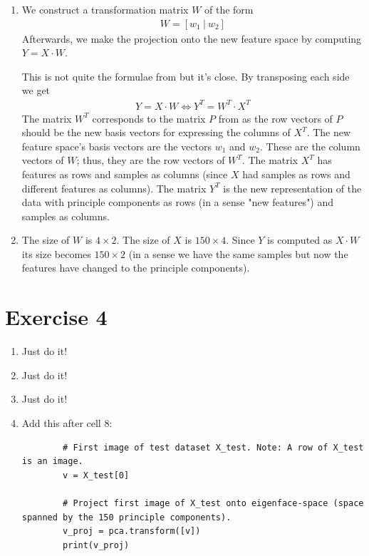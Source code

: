 \documentclass{article}
\begin{document}
\begin{enumerate}[label = \arabic*)]
	\item We construct a transformation matrix $W$ of the form
	\begin{align*}
		W = [w_1 \ | \ w_2]
	\end{align*}
	Afterwards, we make the projection onto the new feature space by computing $Y = X\cdot W$. 
	
	This is not quite the formulae from \cite[p.~7]{eigenfaces} but it's close. 	
	By transposing each side we get 
	\begin{align*}
		Y = X\cdot W \Leftrightarrow Y^T = W^T\cdot X^T
	\end{align*}
	The matrix $W^T$ corresponds to the matrix $P$ from \cite[p.~7]{eigenfaces} as the row vectors of $P$ should be the new basis vectors for expressing the columns of $X^T$. The new feature space's basis vectors are the vectors $w_1$ and $w_2$. These are the column vectors of $W$; thus, they are the row vectors of $W^T$. The matrix $X^T$ has features as rows and samples as columns (since $X$ had samples as rows and different features as columns). The matrix $Y^T$ is the new representation of the data with principle components as rows (in a sense "new features") and samples as columns.
	
	
	\item The size of $W$ is $4\times 2$. The size of $X$ is $150\times 4$. Since $Y$ is computed as $X\cdot W$ its size becomes $150\times 2$ (in a sense we have the same samples but now the features have changed to the principle components).
	
\end{enumerate}

\section*{Exercise 4}

\begin{enumerate}[label = \arabic*)]
	\item Just do it!
	\item Just do it!	
	\item Just do it!	
	\item Add this after cell 8:
	\begin{lstlisting}
		# First image of test dataset X_test. Note: A row of X_test is an image.
		v = X_test[0]
		
		# Project first image of X_test onto eigenface-space (space spanned by the 150 principle components).
		v_proj = pca.transform([v])
		print(v_proj)
	\end{lstlisting}
\end{enumerate}

\clearpage


\end{document}
